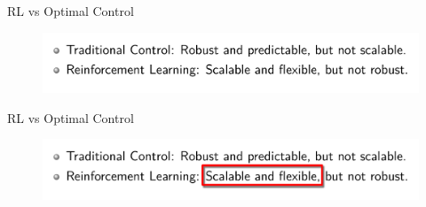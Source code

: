 \begin{frame}{RL vs Optimal Control}
    \begin{figure}
        \centering
        \includegraphics[width=\textwidth]{img/rl_vs_oc.png}
      \end{figure}
\end{frame}
\begin{frame}{RL vs Optimal Control}

    \begin{figure}
        \centering
        \includegraphics[width=\textwidth]{img/rl_vs_oc_annotated.png}
      \end{figure}
\end{frame}